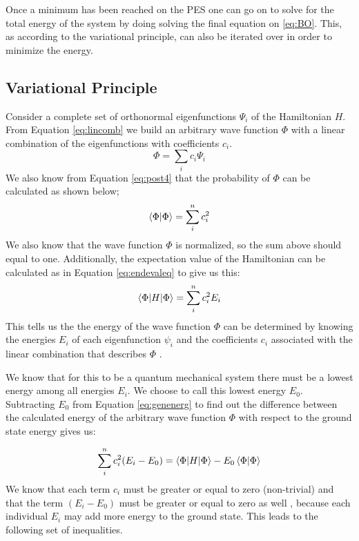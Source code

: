 \documentclass[../master_thesis.tex]{subfiles}
\begin{document}
Once a minimum has been reached on the \ac{PES} one can go on to solve for the
total energy of the system by doing solving the final equation on \ref{eq:BO}.
This, as according to the variational principle, can also be iterated over in
order to minimize the energy.

\subsection{Variational Principle}
Consider a complete set of orthonormal eigenfunctions $ \Psi_i$  of the
Hamiltonian $H$. From Equation \ref{eq:lincomb} we build an arbitrary
wave function $\Phi$ with a linear combination of the eigenfunctions with
coefficients $c_i$.
\begin{equation}
  \Phi = \sum\limits_ic_i\Psi_i
\end{equation}
We also know from Equation \ref{eq:post4} that the probability of $\Phi$ can
be calculated as shown below;
\begin{equation}
  \braket{\Phi|\Phi} = \sum\limits_i^nc_i^2
\end{equation}
We also know that the wave function $\Phi$ is normalized, so the sum above
should equal to one. Additionally, the expectation value of the Hamiltonian can
be calculated as in Equation \ref{eq:endevaleq} to give us this:
\begin{equation}
  \braket{\Phi|H|\Phi} = \sum\limits_i^nc_i^2E_i\label{eq:genenerg}
\end{equation}
This tells us the the energy of the wave function $\Phi$ can be determined by
knowing the energies $E_i$ of each eigenfunction $\psi_i$ and the coefficients
$c_i$ associated with the linear combination that describes $\Phi$
\cite{Cramer:2004}.

We know that for this to be a quantum mechanical system there must be a lowest
energy among all energies $E_i$. We choose to call this lowest energy $E_0$.
Subtracting $E_0$ from Equation \ref{eq:genenerg} to find out the difference
between the calculated energy of the arbitrary wave function $\Phi$ with respect
to the ground state energy gives us:

\begin{equation}
   \sum\limits_i^nc_i^2(E_i - E_0) = \braket{\Phi | H | \Phi} -
   E_0\braket{\Phi | \Phi}
\end{equation}
We know that each term $c_i$ must be greater or equal to zero (non-trivial) and
that the term $(E_i - E_0)$ must be greater or equal to zero as well
\cite{Cramer:2004}, because each individual $E_i$ may add more energy to the
ground state. This leads to the following set of inequalities.
\end{document}
